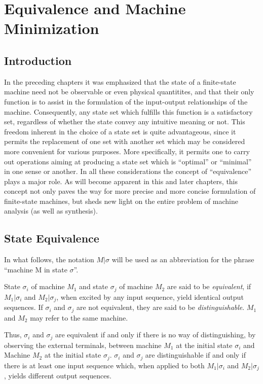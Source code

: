 \documentclass[a4paper]{report}
\begin{document}
\chapter{Equivalence and Machine Minimization}
\section{Introduction}
\label{labelIntroduction}

In the preceding chapters it was emphasized that the state of a finite-state machine need not be observable or even physical quantitites, and that their only function is to assist in the formulation of the input-output relationships of the machine. Consequently, any state set which fulfills this function is a satisfactory set, regardless of whether the state convey any intuitive meaning or not. This freedom inherent in the choice of a state set is quite advantageous, since it permits the replacement of one set with another set which may be considered more convenient for various purposes. More specifically, it permits one to carry out operations aiming at producing a state set which is ``optimal'' or ``minimal'' in one sense or another. In all these considerations the concept of ``equivalence'' plays a major role. As will become apparent in this and later chapters, this concept not only paves the way for more precise and more concise formulation of finite-state machines, but sheds new light on the entire problem of machine analysis (as well as synthesis).

\section{State Equivalence}
\label{sectionStateEquivalence}

In what follows, the notation $ M |\sigma $ will be used as an abbreviation for the phrase ``machine M in state $\sigma$''.

 \label{labelEquivalence}  State $ \sigma_i $ of machine $M_1$ and state $\sigma_j$ of machine $M_2$ are said to be \emph{equivalent}, if $M_1|\sigma_i$ and $M_2|\sigma_j$, when excited by any input sequence, yield identical output sequences. If $\sigma_i$ and $\sigma_j$ are not equivalent, they are said to be \emph{distinguishable}. $M_1$ and $M_2$ may refer to the same machine.

    Thus, $\sigma_i$ and $\sigma_j$ are equivalent if and only if there is no way of distinguishing, by observing the external terminals, between machine $M_1$ at the initial state $\sigma_i$ and Machine $M_2$ at the initial state $\sigma_j$. $\sigma_i$ and $\sigma_j$ are distinguishable if and only if there is at least one input sequence which, when applied to both $M_1|\sigma_i$ and $M_2|\sigma_j$, yields different output sequences.
\end{document}
